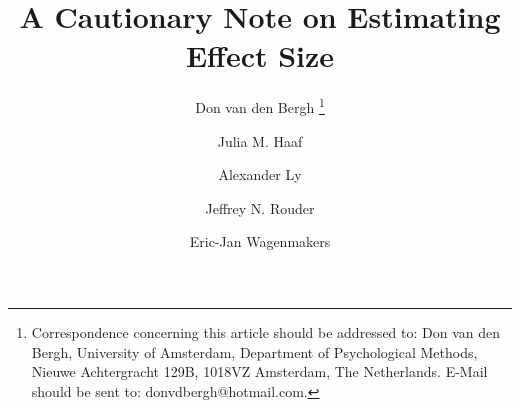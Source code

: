 \documentclass[a4paper]{article}
\newcommand{\osflink}{\url{https://osf.io/uq8st/}}
\newcommand{\CamererReplication}{\url{https://mfr.osf.io/render?url=https://osf.io/fg4d3/?action=download\%26mode=render}}
\newcommand{\manyLabsLink}{\url{https://mfr.osf.io/render?url=https://osf.io/xufw4/?action=download\%26mode=render}}
\renewcommand{\thefootnote}{\fnsymbol{footnote}}
\renewcommand*{\thefootnote}{\arabic{footnote}}
\begin{document}
\newcommand{\osflink}{\url{https://osf.io/uq8st/}}

\newcommand{\CamererReplication}{\url{https://mfr.osf.io/render?url=https://osf.io/fg4d3/?action=download\%26mode=render}}
\newcommand{\manyLabsLink}{\url{https://mfr.osf.io/render?url=https://osf.io/xufw4/?action=download\%26mode=render}}


\title{A Cautionary Note on Estimating Effect Size}
\renewcommand{\thefootnote}{\fnsymbol{footnote}}
\author[1]{Don van den Bergh%
	\thanks{Correspondence concerning this article should be addressed to: Don van den Bergh, University of Amsterdam, Department of Psychological Methods, Nieuwe Achtergracht 129B, 1018VZ Amsterdam, The Netherlands. E-Mail should be sent to: donvdbergh@hotmail.com.
}}
\author[1]{Julia M. Haaf}
\author[1,2]{Alexander Ly}
\author[3]{\authorcr Jeffrey N. Rouder} %
\author[1]{Eric-Jan Wagenmakers}
\date{}
\renewcommand*{\thefootnote}{\arabic{footnote}}
%

\tbEffectSizeExample
{}\reanalysis
\end{document}
